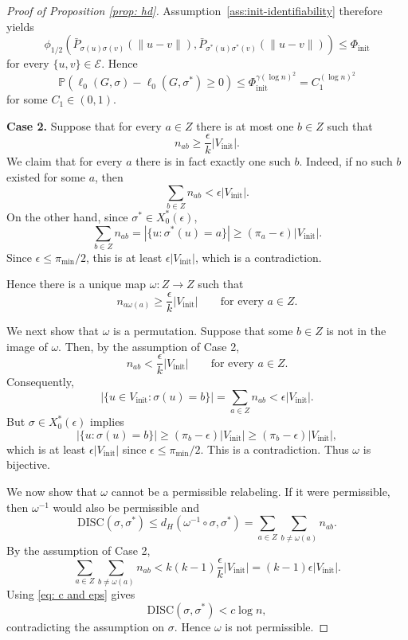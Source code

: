 \documentclass[11pt, a4paper]{amsart}
\newcommand{\1}{\mathbf{1}}
\theoremstyle{definition}
\theoremstyle{remark}
\theoremstyle{definition}
\begin{document}
\begin{proof}[Proof of Proposition \ref{prop: hd}]
Assumption~\ref{ass:init-identifiability} therefore yields
\[
\phi_{1/2}\left(
\bar P_{\sigma(u)\sigma(v)}(\|u-v\|),
\bar P_{\sigma^*(u)\sigma^*(v)}(\|u-v\|)
\right)
\leq
\Phi_{\mathrm{init}}
\]
for every $\{u,v\}\in\mathcal E$. Hence
\[
\mathbb P\left(
\ell_0(G,\sigma)-\ell_0(G,\sigma^*)\geq0
\right)
\leq
\Phi_{\mathrm{init}}^{\gamma(\log n)^2}
=
C_1^{(\log n)^2}
\]
for some $C_1\in(0,1)$.
\medskip

\noindent
\textbf{Case 2.}
Suppose that for every $a\in Z$ there is at most one $b\in Z$ such that
\[
n_{ab}\geq
\frac{\epsilon}{k}|V_{\mathrm{init}}|.
\]
We claim that for every $a$ there is in fact exactly one such $b$.
Indeed, if no such $b$ existed for some $a$, then
\[
\sum_{b\in Z}n_{ab}
<
\epsilon|V_{\mathrm{init}}|.
\]
On the other hand, since $\sigma^*\in X_0^*(\epsilon)$,
\[
\sum_{b\in Z}n_{ab}
=
|\{u:\sigma^*(u)=a\}|
\geq
(\pi_a-\epsilon)|V_{\mathrm{init}}|.
\]
Since $\epsilon\leq\pi_{\min}/2$, this is at least
$\epsilon|V_{\mathrm{init}}|$, which is a contradiction.

Hence there is a unique map $\omega:Z\to Z$ such that
\[
n_{a\omega(a)}
\geq
\frac{\epsilon}{k}|V_{\mathrm{init}}|
\qquad\text{for every }a\in Z.
\]

We next show that $\omega$ is a permutation. Suppose that some
$b\in Z$ is not in the image of $\omega$. Then, by the assumption of
Case 2,
\[
n_{ab}
<
\frac{\epsilon}{k}|V_{\mathrm{init}}|
\qquad\text{for every }a\in Z.
\]
Consequently,
\[
|\{u \in V_{\mathrm{init}}:\sigma(u)=b\}|
=
\sum_{a\in Z} n_{ab}
<
\epsilon|V_{\mathrm{init}}|.
\]
But $\sigma\in X_0^*(\epsilon)$ implies
\[
|\{u:\sigma(u)=b\}|
\geq
(\pi_b-\epsilon)|V_{\mathrm{init}}|
\geq
(\pi_b-\epsilon)|V_{\mathrm{init}}|,
\]
which is at least
$\epsilon|V_{\mathrm{init}}|$ since
$\epsilon\leq\pi_{\min}/2$. This is a contradiction. Thus $\omega$ is
bijective.

We now show that $\omega$ cannot be a permissible relabeling. If it
were permissible, then $\omega^{-1}$ would also be permissible and
\[
\mathrm{DISC}(\sigma,\sigma^*)
\leq
d_H(\omega^{-1}\circ\sigma,\sigma^*)
=
\sum_{a\in Z}\sum_{b\neq\omega(a)}n_{ab}.
\]
By the assumption of Case 2,
\[
\sum_{a\in Z}\sum_{b\neq\omega(a)}n_{ab}
<
k(k-1)
\frac{\epsilon}{k}|V_{\mathrm{init}}|
=
(k-1)\epsilon|V_{\mathrm{init}}|.
\]
Using \eqref{eq: c and eps} gives
\[
\mathrm{DISC}(\sigma,\sigma^*)
<
c\log n,
\]
contradicting the assumption on $\sigma$. Hence $\omega$ is not
permissible.


\end{proof}
\end{document}
